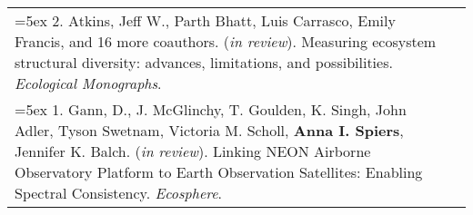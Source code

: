 \begin{longtable}{@{} >{\raggedright}p{6.10in} >{\raggedleft}X @{}}

\hangindent=5ex 2. Atkins, Jeff W., Parth Bhatt, Luis Carrasco, Emily Francis, and 16 more coauthors. (\emph{in review}). Measuring ecosystem structural diversity: advances, limitations, and possibilities. \emph{Ecological Monographs}.  &  \tabularnewline

\hangindent=5ex 1. Gann, D., J. McGlinchy, T. Goulden, K. Singh, John Adler, Tyson Swetnam, Victoria M. Scholl, \textbf{Anna I. Spiers}, Jennifer K. Balch. (\emph{in review}). Linking NEON Airborne Observatory Platform to Earth Observation Satellites: Enabling Spectral Consistency. \emph{Ecosphere}.  & \tabularnewline


\end{longtable}

